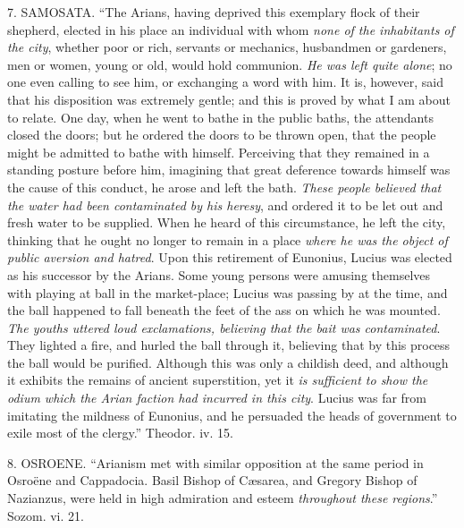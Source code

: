 7. SAMOSATA.
``The Arians, having deprived this exemplary flock of their shepherd,
elected in his place an individual with whom \emph{none of the inhabitants
of the city}, whether poor or rich, servants or mechanics, husbandmen
or gardeners, men or women, young or old, would hold communion. \emph{He
was left quite alone}; no one even calling to see him, or exchanging
a word with him. It is, however, said that his disposition was extremely
gentle; and this is proved by what I am about to relate. One day, when
he went to bathe in the public baths, the attendants closed the doors;
but he ordered the doors to be thrown open, that the people might be
admitted to bathe with himself. Perceiving that they remained in a
standing posture before him, imagining that great deference towards
himself was the cause of this conduct, he arose and left the bath. \emph{These
people believed that the water had been contaminated by his heresy},
and ordered it to be let out and fresh water to be supplied. When he
heard of this circumstance, he left the city, thinking that he ought no
longer to remain in a place \emph{where he was the object of public
aversion and hatred}. Upon this retirement of Eunonius, Lucius was
elected as his successor by the Arians. Some young persons were amusing
themselves with playing at ball in the market-place; Lucius was passing
by at the time, and the ball happened to fall beneath the feet of the
ass on which he was mounted. \emph{The youths uttered loud exclamations,
believing that the bait was contaminated}. They lighted a fire, and
hurled the ball through it, believing that by this process the ball
would be purified. Although this was only a childish deed, and although
it exhibits the remains of ancient superstition, yet it \emph{is sufficient
to show the odium which the Arian faction had incurred in this city}.
Lucius was far from imitating the mildness of Eunonius, and he persuaded
the heads of government to exile most of the clergy.'' Theodor. iv. 15.

8. OSROENE.
``Arianism met with similar opposition at the same period in Osroëne and
Cappadocia. Basil Bishop of Cæsarea, and Gregory Bishop of Nazianzus,
were held in high admiration and esteem \emph{throughout these regions}.''
Sozom. vi. 21.

